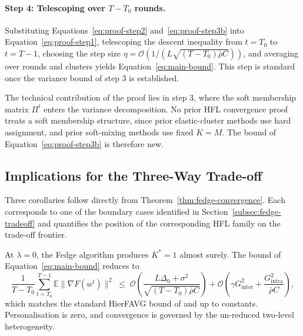 \paragraph{Step 4: Telescoping over $T - T_{0}$ rounds.}
Substituting Equations~\eqref{eq:proof-step2} and~\eqref{eq:proof-step3b} into Equation~\eqref{eq:proof-step1}, telescoping the descent inequality from $t = T_{0}$ to $t = T - 1$, choosing the step size $\eta = \mathcal{O}(1 / (L \sqrt{(T - T_{0}) \bar{\rho} C}))$, and averaging over rounds and clusters yields Equation~\eqref{eq:main-bound}. This step is standard once the variance bound of step 3 is established.

The technical contribution of the proof lies in step 3, where the soft membership matrix $\Pi^{t}$ enters the variance decomposition. No prior HFL convergence proof treats a soft membership structure, since prior elastic-cluster methods \cite{jaramillo2026dpmmcfl, peng2025feddaa} use hard assignment, and prior soft-mixing methods \cite{lee2025phefl, ma2024personalized} use fixed $K = M$. The bound of Equation~\eqref{eq:proof-step3b} is therefore new.

\subsection{Implications for the Three-Way Trade-off}
\label{subsec:fedge-implications}

Three corollaries follow directly from Theorem~\ref{thm:fedge-convergence}. Each corresponds to one of the boundary cases identified in Section~\ref{subsec:fedge-tradeoff} and quantifies the position of the corresponding HFL family on the trade-off frontier.

\begin{corollary}[Convergence corner, $\lambda = 0$]
\label{cor:convergence-corner}
At $\lambda = 0$, the Fedge algorithm produces $K^{*} = 1$ almost surely. The bound of Equation~\eqref{eq:main-bound} reduces to
\begin{equation}
\label{eq:corollary-lambda-0}
\frac{1}{T - T_{0}} \sum_{t = T_{0}}^{T-1} \mathbb{E} \big\| \nabla F(w^{t}) \big\|^{2} \;\leq\; \mathcal{O}\!\left( \frac{L \Delta_{0} + \sigma^{2}}{\sqrt{(T - T_{0}) \bar{\rho} C}} \right) + \mathcal{O}\!\left( \gamma G_{\text{inter}}^{2} + \frac{G_{\text{intra}}^{2}}{\bar{\rho} C} \right),
\end{equation}
which matches the standard HierFAVG bound of \cite{liu2020hierfavg} and \cite{jiang2024partial} up to constants. Personalisation is zero, and convergence is governed by the un-reduced two-level heterogeneity.
\end{corollary}

